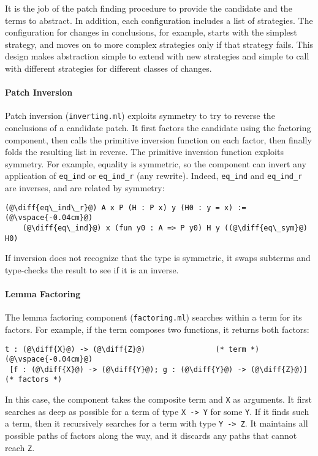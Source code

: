 It is the job of the patch finding procedure to provide the candidate and the terms to abstract.
In addition, each configuration includes a list of strategies.
The configuration for changes in conclusions, for example, starts with the simplest strategy,
and moves on to more complex strategies only if that strategy fails.
This design makes abstraction simple to extend with new strategies and simple to call with different strategies
for different classes of changes.

\paragraph{Patch Inversion} Patch inversion (\lstinline{inverting.ml}) exploits symmetry to try to reverse the conclusions of a 
candidate patch.
It first factors the candidate using the factoring component, then calls the primitive inversion
function on each factor, then finally folds the resulting list in reverse.
The primitive inversion function exploits symmetry. 
For example, equality is symmetric, so the component can invert any application of \lstinline{eq_ind} or \lstinline{eq_ind_r}
(any rewrite). Indeed, \lstinline{eq_ind} and \lstinline{eq_ind_r} are inverses, and are related by symmetry:

\begin{lstlisting}[language=coq]
  (@\diff{eq\_ind\_r}@) A x P (H : P x) y (H0 : y = x) :=(@\vspace{-0.04cm}@)
    (@\diff{eq\_ind}@) x (fun y0 : A => P y0) H y ((@\diff{eq\_sym}@) H0)	
\end{lstlisting}
If inversion does not recognize that the type is symmetric, it
swaps subterms and type-checks the result to see if it is an inverse.

\paragraph{Lemma Factoring} The lemma factoring component (\lstinline{factoring.ml}) searches within a term
for its factors. For example,
if the term composes two functions, it returns both factors:

\begin{lstlisting}[language=coq]
  t : (@\diff{X}@) -> (@\diff{Z}@)                (* term *)(@\vspace{-0.04cm}@)
 [f : (@\diff{X}@) -> (@\diff{Y}@); g : (@\diff{Y}@) -> (@\diff{Z}@)] (* factors *)
\end{lstlisting}
In this case, the component takes the composite term and \lstinline{X} as arguments.
It first searches as deep as possible for a term of type \lstinline{X -> Y} for some \lstinline{Y}.
If it finds such a term, then it recursively searches for a term with type \lstinline{Y -> Z}. 
It maintains all possible 
paths of factors along the way, and it discards any paths that cannot reach \lstinline{Z}.

